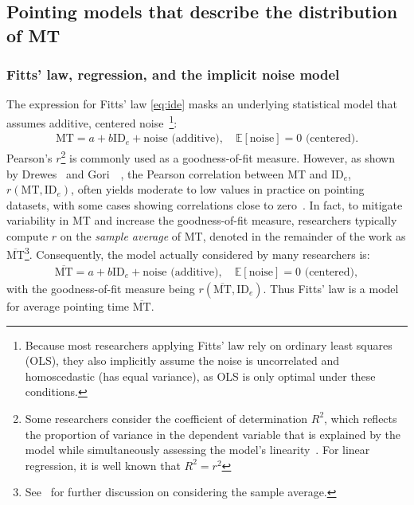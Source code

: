 \documentclass[acmlarge, manuscript,review]{acmart}
\newcommand{\mmt}{\ensuremath{\overline{\mt}}\xspace}
\newcommand{\mt}{\ensuremath{{\text{MT}}}\xspace}
\newcommand{\ide}{\ensuremath{{\text{ID}_e}}\xspace}
\begin{document}
\subsection{Pointing models that describe the distribution of MT}
\subsubsection{Fitts' law, regression, and the implicit noise model \label{subs:rw::fitts}}
The expression for Fitts' law \autoref{eq:ide} masks an underlying statistical model that assumes additive, centered noise~\cite{soukoreff2004}\footnote{Because most researchers applying Fitts' law rely on ordinary least squares (OLS), they also implicitly assume the noise is uncorrelated and homoscedastic (has equal variance), as OLS is only optimal under these conditions.}:
\begin{align} \mt = a + b\ide + \text{noise (additive)}, \quad \mathbb{E}[\text{noise}] = 0 \text{ (centered)}. \label{eq:mt} \end{align}
Pearson's $r$\footnote{Some researchers consider the coefficient of determination $R^2$, which reflects the proportion of variance in the dependent variable that is explained by the model while simultaneously assessing the model’s linearity~\cite{lee1988}. For linear regression, it is well known that $R^2 = r^2$} is commonly used as a goodness-of-fit measure. %
However, as shown by Drewes~\cite{drewes2013} and Gori~\etal~\cite{gori2018chi}, the Pearson correlation between MT and \ide, $r(\mt, \ide)$, often yields moderate to low values in practice on pointing datasets, with some cases showing correlations close to zero~\cite{gori2018tochi}.
In fact, to mitigate variability in MT and increase the goodness-of-fit measure, researchers typically compute $r$ on the \textit{sample average} of MT, denoted in the remainder of the work as \mmt\footnote{See~\cite{gori2017two} for further discussion on considering the sample average.}. Consequently, the model actually considered by many researchers is:
\begin{align}
	\mmt = a + b\ide + \text{noise (additive)}, \quad \mathbb{E}[\text{noise}] = 0 \text{ (centered)}, \label{eq:mmt}
\end{align}
with the goodness-of-fit measure being $r(\mmt, \ide)$. Thus Fitts' law is a model for average pointing time \mmt.
\end{document}
